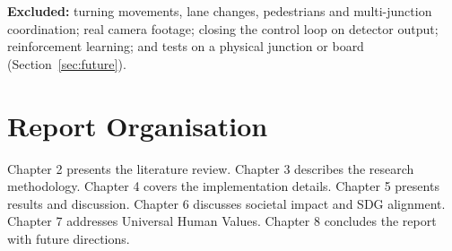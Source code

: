 \textbf{Excluded:} turning movements, lane changes, pedestrians and multi-junction coordination; real camera footage; closing the control loop on detector output; reinforcement learning; and tests on a physical junction or board (Section~\ref{sec:future}).

\section{Report Organisation}
Chapter 2 presents the literature review.
Chapter 3 describes the research methodology.
Chapter 4 covers the implementation details.
Chapter 5 presents results and discussion.
Chapter 6 discusses societal impact and SDG alignment.
Chapter 7 addresses Universal Human Values.
Chapter 8 concludes the report with future directions.
